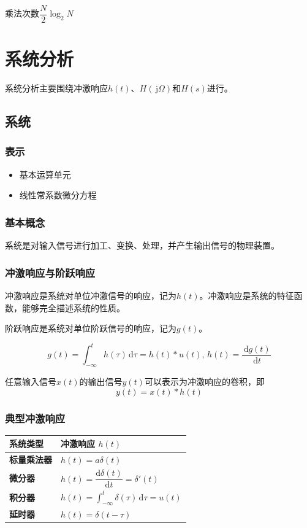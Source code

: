 \documentclass[UTF8,fontset=fandol,zihao=5]{ctexart}
\newcommand{\jj}{\,\mathrm{j}}
\newcommand{\dd}{\,\mathrm{d}}
\begin{document}
乘法次数$\dfrac{N}{2}\log_2 N$

\section{系统分析}

系统分析主要围绕冲激响应$h(t)$、$H(\jj \varOmega)$和$H(s)$进行。

\subsection{系统}

\subsubsection{表示}

\begin{itemize}
  \item 基本运算单元
  \item 线性常系数微分方程
\end{itemize}

\subsubsection{基本概念}
系统是对输入信号进行加工、变换、处理，并产生输出信号的物理装置。

\subsubsection{冲激响应与阶跃响应}

冲激响应是系统对单位冲激信号的响应，记为$h(t)$。冲激响应是系统的特征函数，能够完全描述系统的性质。

阶跃响应是系统对单位阶跃信号的响应，记为$g(t)$。

\begin{methodbox}[二者关系]
  \[
  g(t)=\int_{-\infty}^{t}h(\tau)\dd\tau=h(t) \ast u(t),\, h(t)=\frac{\dd g(t)}{\dd t}
  \]
\end{methodbox}

任意输入信号$x(t)$的输出信号$y(t)$可以表示为冲激响应的卷积，即
\[
y(t) = x(t) \ast h(t)
\]

\subsubsection{典型冲激响应}

\begin{center}
\begin{tabularx}{0.98\textwidth}{>{\bfseries}p{2cm}X}
\toprule
系统类型 & 冲激响应 $h(t)$ \\
\midrule
        标量乘法器 & $h(t)=a\delta(t)$ \\
        微分器 & $h(t)=\dfrac{\mathrm{d}\delta(t)}{\mathrm{d}t}=\delta'(t)$ \\
        积分器 & $h(t)=\displaystyle\int_{-\infty}^{t}\delta(\tau)\,\mathrm{d}\tau=u(t)$ \\
        延时器 & $h(t)=\delta(t-\tau)$ \\
\bottomrule
\end{tabularx}
\end{center}
\end{document}
